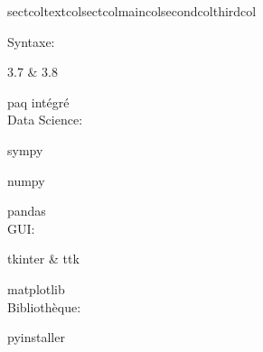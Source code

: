 \documentclass[10pt,A4]{article}
\begin{document}
\begin{minipage}{0.59\textwidth}
{\begin{barchart}{10}{5.5}{sectcol}{textcol}{sectcol}{maincol}{secondcol}{thirdcol}
		\end{barchart}
		
		\hspace{15pt}
	
		\parbox[b][70pt][c]{0.3\textwidth}{
		
		\textcolor{textcol}{\faCode \hspace{1pt} Syntaxe:}
		
		\hspace{10pt}
		\textcolor{textcol}{\faPython \hspace{1pt} 3.7 \& 3.8}
		
		\hspace{10pt}	 		
		\textcolor{textcol}{\faTerminal\hspace{1pt} paq intégré}\\
			 		
		\textcolor{textcol}{\faChartPie \hspace{1pt} Data Science:}
		
		\hspace{10pt}	 		
		\textcolor{textcol}{\faSuperscript \hspace{1.5pt} sympy}
		
		\hspace{10pt}	 		
		\textcolor{textcol}{\faSortNumericDown \hspace{2pt} numpy}	
		
		\hspace{10pt}	 		
		\textcolor{textcol}{\faTable \hspace{1pt} pandas}\\
		
		\textcolor{textcol}{\faLaptopCode \hspace{1pt} GUI:}
			
		\hspace{10pt}  		
		\textcolor{textcol}{\faFeather \hspace{1pt} tkinter \& ttk}	
		
		\hspace{10pt}			 		
		\textcolor{textcol}{\faChartArea \hspace{1pt} matplotlib}\\
			 		
		\textcolor{textcol}{\faBoxes \hspace{1pt} Bibliothèque:}
		
		\hspace{10pt}	 		
		\textcolor{textcol}{\faDAndD \hspace{1pt} pyinstaller}
		}
	}
	

\end{minipage}
\end{document}
